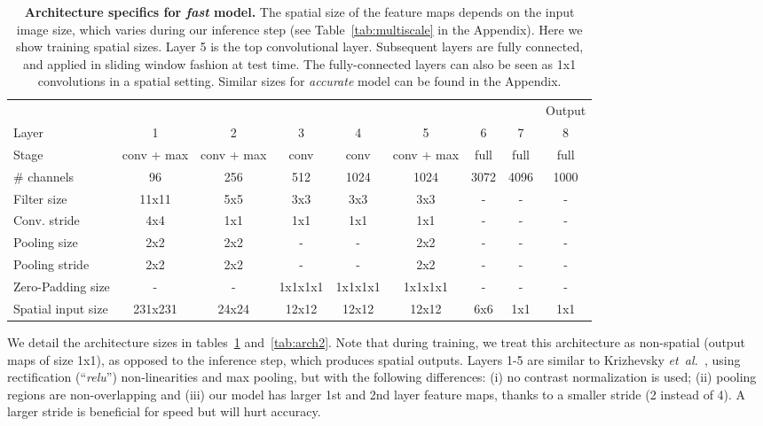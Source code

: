 \documentclass{article} %
\newcommand{\tab}[1]{Table~\ref{tab:#1}}
\def\etal{{\textit{et~al.~}}}
\begin{document}
\begin{table}[h!]
\scriptsize
\begin{center}
\begin{tabular}{|l||c|c|c|c|c||c|c||c|}
  \hline  
         &     &   &   &   &   &   &   & Output \\ 
  Layer  &   1 & 2 & 3 & 4 & 5 & 6 & 7 & 8 \\ \hline
  \hline
  Stage & conv + max & conv + max & conv & conv & conv + max & full & full & full \\ \hline
  \# channels &   96 & 256 & 512 & 1024 & 1024 & 3072 & 4096  & 1000 \\ \hline
  Filter size &  11x11 & 5x5 & 3x3 & 3x3 & 3x3 & - & - & - \\ \hline
  Conv. stride &  4x4 & 1x1 & 1x1 & 1x1 & 1x1 & - & - & -  \\ \hline
  Pooling size &  2x2 & 2x2 & - & - & 2x2 & - & - & -  \\ \hline
  Pooling stride& 2x2 & 2x2 & - & - & 2x2 & - & - & -  \\ \hline
  Zero-Padding size &  - & - & 1x1x1x1 & 1x1x1x1 & 1x1x1x1 & - & - & -  \\ \hline
  Spatial input size & 231x231 & 24x24 & 12x12 & 12x12 & 12x12 &  6x6 & 1x1 & 1x1    \\ \hline
 
  \hline
\end{tabular}
\vspace*{2mm}
\caption{\textbf{Architecture specifics for {\em fast} model.} The spatial
  size of the feature maps depends on the input image size, which
  varies during our inference step (see \tab{multiscale} in the Appendix).
  Here we show training spatial sizes. Layer 5 is
  the top convolutional layer. Subsequent layers are fully
  connected, and applied in sliding window fashion at test time.
  The fully-connected layers can also be seen as 1x1
  convolutions in a spatial setting.  Similar sizes for {\em accurate} model
  can be found in the Appendix.}
\label{tab:arch}
\end{center}
\end{table}

We detail the architecture sizes in tables~\ref{tab:arch} and~\ref{tab:arch2}.
Note that during training,
we treat this architecture as non-spatial (output maps of size 1x1),
as opposed to the inference step, which produces spatial outputs. Layers 1-5 are similar to
Krizhevsky \etal \cite{Kriz12}, using rectification (``{\em relu}'') non-linearities and
max pooling, but with the following differences: (i) no
contrast normalization is used; (ii) pooling regions are
non-overlapping and (iii) our model has larger 1st and 2nd layer
feature maps, thanks to a smaller stride (2 instead of 4). A larger stride
is beneficial for speed but will hurt accuracy.
\end{document}
